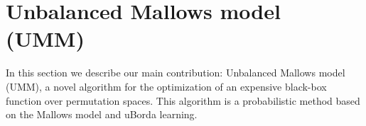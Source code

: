 \documentclass[sigconf,dvipsnames]{acmart}
\begin{document}
\section{Unbalanced Mallows model (UMM)}\label{sec:umm}




In this section we describe our main contribution: Unbalanced Mallows model
(UMM), a novel algorithm for the optimization of an expensive black-box function over
permutation spaces. This algorithm is a probabilistic method based on the
Mallows model and uBorda learning.%


\newcommand{\tuple}[1]{\ensuremath{\langle #1\rangle}}
\end{document}
